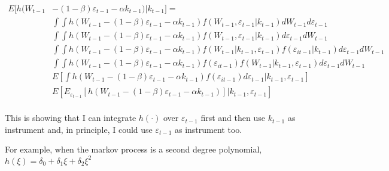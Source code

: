 \documentclass[
  letterpaper,
  DIV=11,
  numbers=noendperiod]{scrartcl}
\begin{document}
\[
\begin{aligned}
E[h(W_{t-1}&-(1-\beta)\varepsilon_{t-1}-\alpha k_{t-1})|k_{t-1}]=\\
    &\int\int h(W_{t-1}-(1-\beta)\varepsilon_{t-1}-\alpha k_{t-1}) f(W_{t-1},\varepsilon_{t-1}|k_{t-1})d W_{t-1}d\varepsilon_{t-1}\\
    &\int\int h(W_{t-1}-(1-\beta)\varepsilon_{t-1}-\alpha k_{t-1}) f(W_{t-1},\varepsilon_{t-1}|k_{t-1})d \varepsilon_{t-1} dW_{t-1}\\   
    &\int\int h(W_{t-1}-(1-\beta)\varepsilon_{t-1}-\alpha k_{t-1}) f(W_{t-1}|k_{t-1},\varepsilon_{t-1}) f(\varepsilon_{it-1}|k_{t-1}) d \varepsilon_{t-1} dW_{t-1}\\
    &\int\int h(W_{t-1}-(1-\beta)\varepsilon_{t-1}-\alpha k_{t-1}) f(\varepsilon_{it-1}) f(W_{t-1}|k_{t-1},\varepsilon_{t-1}) d \varepsilon_{t-1} dW_{t-1}\\
    & E \left[\int h(W_{t-1}-(1-\beta)\varepsilon_{t-1}-\alpha k_{t-1}) f(\varepsilon_{it-1}) d\varepsilon_{t-1}|k_{t-1},\varepsilon_{t-1}\right]\\
    &E[E_{\varepsilon_{t-1}}[h(W_{t-1}-(1-\beta)\varepsilon_{t-1}-\alpha k_{t-1})]|k_{t-1},\varepsilon_{t-1}]\\
\end{aligned}
\]

This is showing that I can integrate \(h(\cdot)\) over
\(\varepsilon_{t-1}\) first and then use \(k_{t-1}\) as instrument and,
in principle, I could use \(\varepsilon_{t-1}\) as instrument too.

For example, when the markov process is a second degree
polynomial,\(h(\xi)=\delta_0+\delta_1 \xi + \delta_2 \xi^2\)
\end{document}
